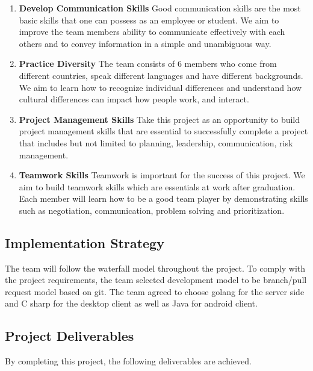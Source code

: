 \documentclass{article}
\begin{document}
\begin{enumerate}
  \item \textbf{Develop Communication Skills} Good communication skills are the most basic skills that one can possess as an employee or student. We aim to improve the team members ability to communicate effectively with each others and  to convey information in a simple and unambiguous way.
  \item \textbf{Practice Diversity} The team consists of 6 members who come from different countries, speak different languages and have different backgrounds. We aim to learn how to recognize individual differences and understand how cultural differences can impact how people work, and interact.
  \item \textbf{Project Management Skills} Take this project as an opportunity to build project management skills that are essential to successfully complete a project that includes but not limited to planning, leadership, communication, risk management.
  \item \textbf{Teamwork Skills} Teamwork is important for the success of this project. We aim to build teamwork skills which are essentials at work after graduation. Each member will learn how to be a good team player by demonstrating skills such as negotiation, communication, problem solving and prioritization.
\end{enumerate}

\subsection{Implementation Strategy}
The team will follow the waterfall model throughout the project. To comply with the project requirements, the team selected development model to be branch/pull request model based on git. The team agreed to choose golang for the server side and C sharp for the desktop client as well as Java for android client.

\subsection{Project Deliverables}
By completing this project, the following deliverables are achieved.
\end{document}
